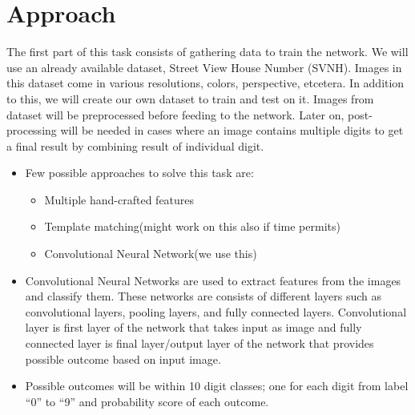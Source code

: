 \documentclass[12pt, letterpaper]{article}
\begin{document}
\section{Approach}
The first part of this task consists of gathering data to train the network. We will use an already available dataset, Street View House Number (SVNH)\cite{Reading Digits in Natural Images
	with Unsupervised Feature Learning}. Images in this dataset come in various resolutions, colors, perspective, etcetera. In addition to this, we will create our own dataset to train and test on it. 
Images from dataset will be preprocessed before feeding to the network. Later on, post-processing will be needed in cases where an image contains multiple digits to get a final result by combining result of individual digit. 
\begin{itemize}
	\item Few possible approaches to solve this task are:
		\begin{itemize}
			\item Multiple hand-crafted features
			\item Template matching(might work on this also if time permits)
			\item Convolutional Neural Network(we use this)
		\end{itemize}
	\item Convolutional Neural Networks are used to extract features
	from the images and classify them. These networks are consists of different layers such as convolutional layers, pooling layers, and fully connected layers. Convolutional layer is first layer of the network that takes input as image and fully connected layer is final layer/output layer of the network that provides possible outcome based on input image.
			
	\item Possible outcomes will be within 10 digit classes; one for each digit from label ``0'' to ``9'' and probability score of each outcome.
\end{itemize}
\end{document}
